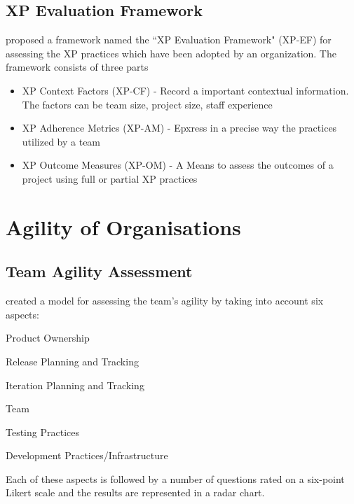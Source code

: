 
\subsection{XP Evaluation Framework} %
\citet{williams2004toward} proposed a framework named the ``XP Evaluation Framework" (XP-EF) for assessing the XP practices which have been adopted by an organization. The framework consists of three parts
\begin{itemize}
\item XP Context Factors (XP-CF) - Record a important contextual information. The factors can be team size, project size, staff experience
\item XP Adherence Metrics (XP-AM) - Epxress in a precise way the practices utilized by a team
\item XP Outcome Measures (XP-OM) - A Means to assess the outcomes of a project using full or partial XP practices
\end{itemize}

\section{Agility of Organisations}

\subsection{Team Agility Assessment} %
\citet{Leffingwell} created a model for assessing the team's agility by taking into account six aspects: 
\begin{inparaenum} [a\upshape)]
\item Product Ownership
\item Release Planning and Tracking
\item Iteration Planning and Tracking
\item Team
\item Testing Practices
\item Development Practices/Infrastructure
\end{inparaenum}

Each of these aspects is followed by a number of questions rated on a six-point Likert scale and the results are represented in a radar chart.

